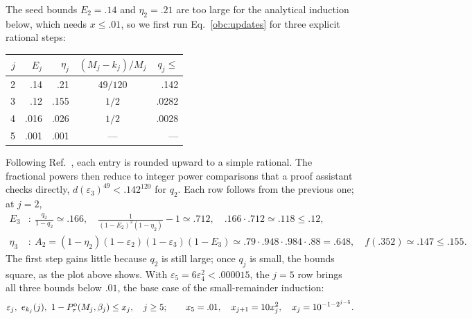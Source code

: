 The seed bounds $E_2=.14$ and $\eta_2=.21$ are too large for the
analytical induction below, which needs $x\le.01$, so we first run
Eq.~\eqref{obc:updates} for three explicit rational steps:
\begin{center}
    \begin{minipage}[c]{.42\textwidth}
        \centering
        \begin{tabular}{@{}rrrcr@{}}
            \toprule
            $j$ & $E_j$ & $\eta_j$ & $(M_j-k_j)/M_j$ & $q_j\le$ \\
            \midrule
            2   & .14   & .21      & $49/120$        & .142     \\
            3   & .12   & .155     & $1/2$           & .0282    \\
            4   & .016  & .026     & $1/2$           & .0028    \\
            5   & .001  & .001     & ---             & ---      \\
            \bottomrule
        \end{tabular}
    \end{minipage}\hfill
    \begin{minipage}[c]{.55\textwidth}
        \centering
        \obcladder
    \end{minipage}
\end{center}
Following Ref.~\cite{OpenAI2026Boundaryfield}, each entry is rounded
upward to a simple rational. The fractional powers then reduce to
integer power comparisons that a proof assistant checks directly,
$d(\varepsilon_3)^{49}<.142^{120}$ for $q_2$. Each row follows from
the previous one; at $j=2$,
\begin{align*}
    E_3    & :\ \frac{q_2}{1-q_2}\simeq.166,\quad
    \frac{1}{(1-E_2)^2(1-\eta_2)}-1\simeq.712,\quad
    .166\cdot.712\simeq.118\le.12,                                      \\
    \eta_3 & :\ A_2=(1-\eta_2)(1-\varepsilon_2)(1-\varepsilon_3)(1-E_3)
    \simeq.79\cdot.948\cdot.984\cdot.88=.648,\quad
    f(.352)\simeq.147\le.155.
\end{align*}
The first step gains little because $q_2$ is still large; once $q_j$
is small, the bounds square, as the plot above shows. With
$\varepsilon_5=6\varepsilon_4^2<.000015$, the $j=5$ row brings all
three bounds below $.01$, the base case of the small-remainder
induction:
\begin{equation}
    \varepsilon_j,\ e_{k_j}(j),\
    1-P_{\tau}^{\mathrm{o}}(M_j,\beta_j)\le x_j,\quad j\ge5;\qquad
    x_5=.01,\quad x_{j+1}=10x_j^2,\quad
    x_j=10^{-1-2^{j-5}}.
    \label{obc:induction}
\end{equation}

